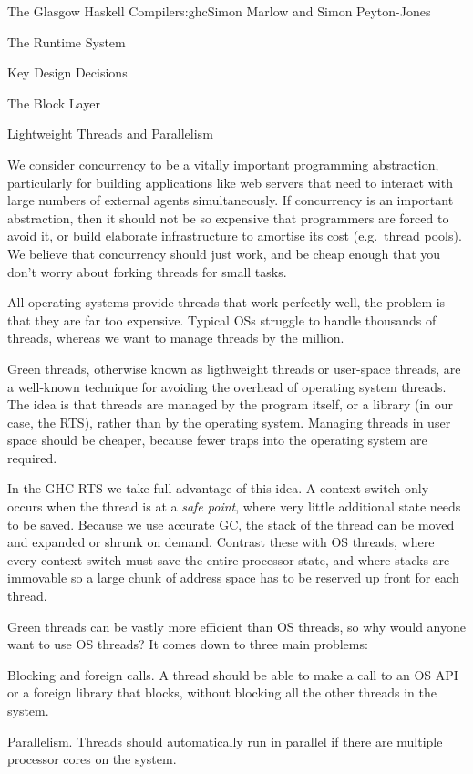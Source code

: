 \begin{aosachapter}{The Glasgow Haskell Compiler}{s:ghc}{Simon Marlow and Simon Peyton-Jones}
\begin{aosasect1}{The Runtime System}
\begin{aosasect2}{Key Design Decisions}
\begin{aosasect3}{The Block Layer}
\end{aosasect3}

\begin{aosasect3}{Lightweight Threads and Parallelism}

We consider concurrency to be a vitally important programming
abstraction, particularly for building applications like web servers
that need to interact with large numbers of external agents
simultaneously.  If concurrency is an important abstraction, then it
should not be so expensive that programmers are forced to avoid it, or
build elaborate infrastructure to amortise its cost (e.g.\ thread
pools).  We believe that concurrency should just work, and be cheap
enough that you don't worry about forking threads for small tasks.

All operating systems provide threads that work perfectly well, the
problem is that they are far too expensive.  Typical OSs struggle to
handle thousands of threads, whereas we want to manage threads by the
million.

Green threads, otherwise known as ligthweight threads or user-space
threads, are a well-known technique for avoiding the overhead of
operating system threads.  The idea is that threads are managed by the
program itself, or a library (in our case, the RTS), rather than by
the operating system.  Managing threads in user space should be
cheaper, because fewer traps into the operating system are required.

In the GHC RTS we take full advantage of this idea.  A context switch
only occurs when the thread is at a \emph{safe point}, where very
little additional state needs to be saved.  Because we use accurate
GC, the stack of the thread can be moved and expanded or shrunk on
demand.  Contrast these with OS threads, where every context switch
must save the entire processor state, and where stacks are immovable
so a large chunk of address space has to be reserved up front for each
thread.

Green threads can be vastly more efficient than OS threads, so why
would anyone want to use OS threads?  It comes down to three main
problems:

\begin{aosaitemize}

\item Blocking and foreign calls.  A thread should be able to make a
  call to an OS API or a foreign library that blocks, without blocking
  all the other threads in the system.

\item Parallelism.  Threads should automatically run in parallel if
  there are multiple processor cores on the system.


\end{aosaitemize}
\end{aosasect3}
\end{aosasect2}
\end{aosasect1}
\end{aosachapter}
